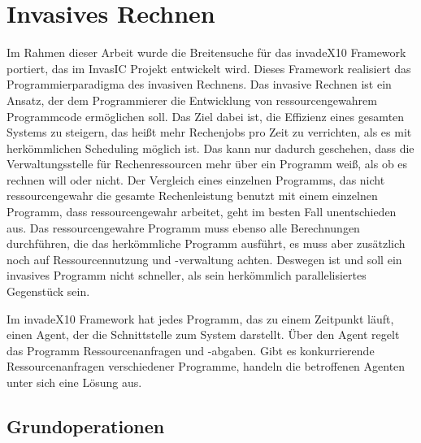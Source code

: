 \section{Invasives Rechnen} %
\label{sec:invasives_rechnen}
Im Rahmen dieser Arbeit wurde die Breitensuche für das invadeX10 Framework \cite{SWB-367212986} portiert, das im InvasIC Projekt entwickelt wird. Dieses Framework realisiert das Programmierparadigma des invasiven Rechnens. Das invasive Rechnen ist ein Ansatz, der dem Programmierer die Entwicklung von ressourcengewahrem Programmcode ermöglichen soll. Das Ziel dabei ist, die Effizienz eines gesamten Systems zu steigern, das heißt mehr Rechenjobs pro Zeit zu verrichten, als es mit herkömmlichen Scheduling möglich ist. Das kann nur dadurch geschehen, dass die Verwaltungsstelle für Rechenressourcen mehr über ein Programm weiß, als ob es rechnen will oder nicht. Der Vergleich eines einzelnen Programms, das nicht ressourcengewahr die gesamte Rechenleistung benutzt mit einem einzelnen Programm, dass ressourcengewahr arbeitet, geht im besten Fall unentschieden aus. Das ressourcengewahre Programm muss ebenso alle Berechnungen durchführen, die das herkömmliche Programm ausführt, es muss aber zusätzlich noch auf Ressourcennutzung und -verwaltung achten. Deswegen ist und soll ein invasives Programm nicht schneller, als sein herkömmlich parallelisiertes Gegenstück sein.

Im invadeX10 Framework hat jedes Programm, das zu einem Zeitpunkt läuft, einen Agent, der die Schnittstelle zum System darstellt. Über den Agent regelt das Programm Ressourcenanfragen und -abgaben. Gibt es konkurrierende Ressourcenanfragen verschiedener Programme, handeln die betroffenen Agenten unter sich eine Lösung aus.
\subsection{Grundoperationen} %
\label{sub:grundoperationen}

